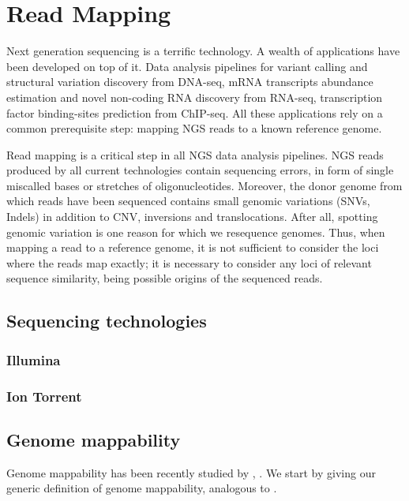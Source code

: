 \chapter{Read Mapping}

Next generation sequencing is a terrific technology.
A wealth of applications have been developed on top of it.
Data analysis pipelines for variant calling and structural variation discovery from DNA-seq, mRNA transcripts abundance estimation and novel non-coding RNA discovery from RNA-seq, transcription factor binding-sites prediction from ChIP-seq.
All these applications rely on a common prerequisite step: mapping NGS reads to a known reference genome.

Read mapping is a critical step in all NGS data analysis pipelines.
NGS reads produced by all current technologies contain sequencing errors, in form of single miscalled bases or stretches of oligonucleotides.
Moreover, the donor genome from which reads have been sequenced contains small genomic variations (SNVs, Indels) in addition to CNV, inversions and translocations.
After all, spotting genomic variation is one reason for which we resequence genomes.
Thus, when mapping a read to a reference genome, it is not sufficient to consider the loci where the reads map exactly; it is necessary to consider any loci of relevant sequence similarity, being possible origins of the sequenced reads.


\section{Sequencing technologies}
\subsection{Illumina}
\subsection{Ion Torrent}


\section{Genome mappability}

Genome mappability has been recently studied by \citep{Derrien2012}, \citep{Lee2012}.
We start by giving our generic definition of genome mappability, analogous to \citep{Derrien2012}.

